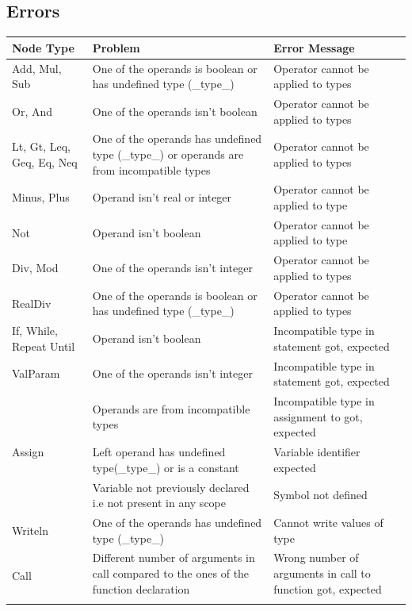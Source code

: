 \documentclass[12pt]{article}
\begin{document}
\subsection{Errors}

\begin{longtable} {|p{3.0cm} | p{8cm} | p{4.0cm}|} 
 \textbf{Node Type} 	& \textbf{Problem} & \textbf{Error Message} \\ \hline
	Add, Mul, Sub 		& One of the operands is boolean or has undefined type (\_type\_) & Operator cannot be applied to types \\ \hline
	Or, And 			& One of the operands isn't boolean & Operator cannot be applied to types \\ \hline
	Lt, Gt, Leq, Geq, Eq, Neq &		One of the operands has undefined type (\_type\_) or operands are from incompatible types & Operator cannot be applied to types \\ \hline
	Minus, Plus 		& Operand isn't real or integer & Operator cannot be applied to type \\ \hline
	Not 				& Operand isn't boolean & Operator cannot be applied to type \\ \hline
	Div, Mod 			& One of the operands isn't integer & Operator cannot be applied to types \\ \hline
	RealDiv				& One of the operands is boolean or has undefined type (\_type\_) & Operator cannot be applied to types \\ \hline
	If, While, Repeat Until & Operand isn't boolean & Incompatible type in statement got, expected \\ \hline
	ValParam 			& One of the operands isn't integer & Incompatible type in statement got, expected \\ \hline
	\multirow{3}{*}{Assign} & Operands are from incompatible types & Incompatible type in assignment to got, expected \\ \cline{2-3}
							& Left operand has undefined type(\_type\_) or is a constant & Variable identifier expected \\ \cline{2-3}
							& Variable not previously declared i.e not present in any scope & Symbol not defined \\ \hline
	Writeln 			& One of the operands has undefined type (\_type\_) & Cannot write values of type \\ \hline
	\multirow{3}{*}{Call} 	& Different number of arguments in call compared to the ones of the function declaration & Wrong number of arguments in call to function got, expected \\ \cline{2-3}

\end{longtable}
\end{document}
